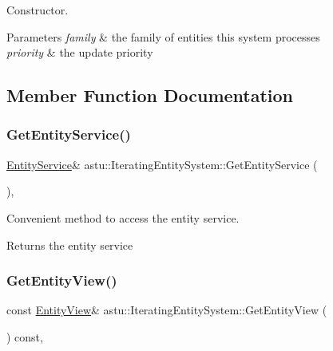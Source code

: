 Constructor.


\begin{DoxyParams}{Parameters}
{\em family} & the family of entities this system processes \\
\hline
{\em priority} & the update priority \\
\hline
\end{DoxyParams}


\subsection{Member Function Documentation}
\mbox{\label{classastu_1_1IteratingEntitySystem_a10b0a3e3be8eb0121b8c864144cb0ff9}} 
\subsubsection{\texorpdfstring{Get\+Entity\+Service()}{GetEntityService()}}
{\footnotesize\ttfamily \hyperlink{classastu_1_1EntityService}{Entity\+Service}\& astu\+::\+Iterating\+Entity\+System\+::\+Get\+Entity\+Service (\begin{DoxyParamCaption}{ }\end{DoxyParamCaption})\hspace{0.3cm}{\ttfamily [inline]}, {\ttfamily [protected]}}

Convenient method to access the entity service.

\begin{DoxyReturn}{Returns}
the entity service 
\end{DoxyReturn}
\mbox{\label{classastu_1_1IteratingEntitySystem_ac5eff21df99058f0a4174257460c28e2}} 
\subsubsection{\texorpdfstring{Get\+Entity\+View()}{GetEntityView()}}
{\footnotesize\ttfamily const \hyperlink{group__ecs__group_gace2fb790b86c3908a65e4222f7ac2f4e}{Entity\+View}\& astu\+::\+Iterating\+Entity\+System\+::\+Get\+Entity\+View (\begin{DoxyParamCaption}{ }\end{DoxyParamCaption}) const\hspace{0.3cm}{\ttfamily [inline]}, {\ttfamily [protected]}}

